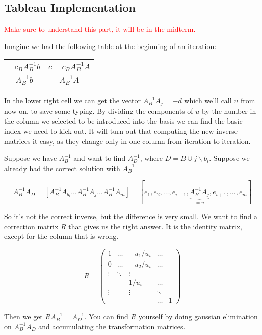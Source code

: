 \subsection{Tableau Implementation}\label{sec:tableau}

\textcolor{red}{Make sure to understand this part, it will be in the midterm.}

Imagine we had the following table at the beginning of an iteration:

\begin{center}
\begin{tabular}{c|c}
$-c_BA_B^{-1}b$ & $c-c_BA_B^{-1}A$\\\hline %
$A^{-1}_B b$ & $A_B^{-1}A$
\end{tabular}
\end{center}

In the lower right cell we can get the vector $A_B^{-1}A_j=-d$ which we'll call $u$ from now on, to save some typing. By dividing the components of $u$ by the number in the column we selected to be introduced into the basis we can find the basic index we need to kick out. It will turn out that computing the new inverse matrices it easy, as they change only in one column from iteration to iteration.

Suppose we have $A_B^{-1}$ and want to find $A_D^{-1}$, where $D=B\cup j \backslash b_i$. Suppose we already had the correct solution with $A_B^{-1}$ 

\[A_B^{-1}A_D = \left[ A_B^{-1}A_{b_i}\ldots A_B^{-1}A_j\ldots A_B^{-1}A_m\right] = \left[ e_1,e_2, \ldots, e_{i-1}, \underbrace{A_B^{-1}A_j}_{=u}, e_{i+1},\ldots, e_m\right]\]

So it's not the correct inverse, but the difference is very small. We want to find a correction matrix $R$ that gives us the right answer. It is the identity matrix, except for the column that is wrong.

\[R= \begin{pmatrix} 
1 & \ldots & -u_1/u_i & \ldots \\
0 & \ldots & -u_2/u_i & \ldots \\
\vdots & \ddots & \vdots \\
& & 1/u_i & \ldots\\
\vdots & &\vdots &\ddots\\
& & & \ldots & 1
\end{pmatrix}\]

Then we get $RA_B^{-1} = A_D^{-1}$. You can find $R$ yourself by doing gaussian elimination on $A_B^{-1}A_D$ and accumulating the transformation matrices.

